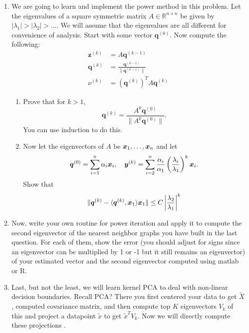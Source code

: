 \documentclass[11pt]{article}
\begin{document}
\begin{enumerate}
\newcommand{\by}{\boldsymbol{y}}
\newcommand{\bz}{\boldsymbol{z}}
\newcommand{\bq}{\boldsymbol{q}}
\newcommand{\bo}{\boldsymbol{1}}

\item We are going to learn and implement the power method in this problem. Let the eigenvalues of a square symmetric matrix $A\in \mathbb{R}^{n\times n}$ be given by $|\lambda_1|>|\lambda_2| > \dots$. We will assume that the eigenvalues are all different for convenience of analysis. Start with some vector $\bq^{(0)}$. Now compute the following:
\begin{align}
\bz^{(k)}&=A\bq^{(k-1)}\\
\bq^{(k)}&=\frac{\bq^{(k-1)}}{\|\bq^{(k-1)}\|}\\
\nu^{(k)}&=(\bq^{(k)})^TA\bq^{(k)}
\end{align}
\begin{enumerate}
\item Prove that for $k>1$, $$\bq^{(k)}=\frac{A^k \bq^{(0)}}{\|A^k \bq^{(0)}\|}.$$ You can use induction to do this.
\item Now let the eigenvectors of $A$ be $\boldsymbol{x}_1,\dots,\boldsymbol{x}_n$ and let $$\bq^{(0)}=\sum_{i=1}^n\alpha_i\bx_i,\ \ \ \by^{(k)}=\sum_{i=2}^n \frac{\alpha_i}{\alpha_1} \left(\frac{\lambda_i}{\lambda_1}\right)^k\bx_i.$$
Show that \begin{align*}
\|\bq^{(k)}-\langle\bq^{(k)},\bx_1\rangle \bx_1\|\leq C\left|\frac{\lambda_2}{\lambda_1}\right|^k
\end{align*}
\end{enumerate}
\item Now, write your own routine for power iteration and apply it to compute the second eigenvector of the nearest neighbor graphs you have built in the last question. For each of them, show the error (you should adjust for signs since an eigenvector can be multiplied by 1 or -1 but it still remains an eigenvector) of your estimated vector and the second eigenvector computed using matlab or R.
\item Last, but not the least, we will learn kernel PCA to deal with non-linear decision boundaries.
Recall PCA? There you first centered your data to get $\tilde{X}$, computed covariance matrix, and then compute top $K$ eigenvectors $V_k$ of this and project a datapoint $\tilde{x}$ to get $\tilde{x}^TV_k$. Now we will directly compute these projections .
\begin{enumerate}

\end{enumerate}
\end{enumerate}
\end{document}
